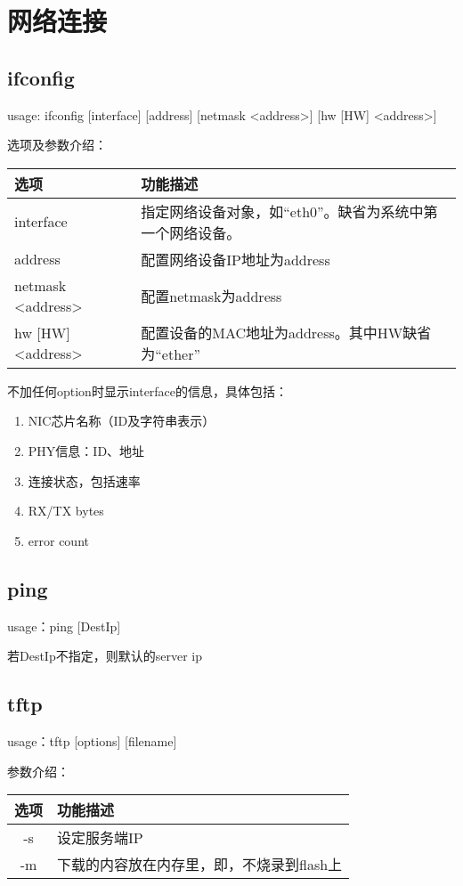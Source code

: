 \section{网络连接}

\subsection{ifconfig}
usage: ifconfig [interface] [address] [netmask <address>] [hw [HW] <address>]

选项及参数介绍：
\begin{table}[H]
\setlength{\parindent}{0pt}
\begin{tabular}{|l|l|} \hline
选项 & 功能描述 \\ \hline
interface & 指定网络设备对象，如``eth0''。缺省为系统中第一个网络设备。 \\ \hline
address & 配置网络设备IP地址为address \\ \hline
netmask <address> & 配置netmask为address \\ \hline
hw [HW] <address> & 配置设备的MAC地址为address。其中HW缺省为``ether'' \\ \hline
\end{tabular}
\end{table}

不加任何option时显示interface的信息，具体包括：
\begin{enumerate} \setlength{\itemsep}{-\itemsep}
\item NIC芯片名称（ID及字符串表示）
\item PHY信息：ID、地址
\item 连接状态，包括速率
\item RX/TX bytes
\item error count
\end{enumerate}

\subsection{ping}
usage：ping [DestIp] 

若DestIp不指定，则默认的server ip

\subsection{tftp}
usage：tftp [options] [filename]

参数介绍：
\begin{table}[H]
\setlength{\parindent}{0pt}
\begin{tabular}{|c|l|} \hline
选项 & 功能描述 \\ \hline
 -s & 设定服务端IP \\ \hline
 -m & 下载的内容放在内存里，即，不烧录到flash上 \\ \hline
\end{tabular}
\end{table}

